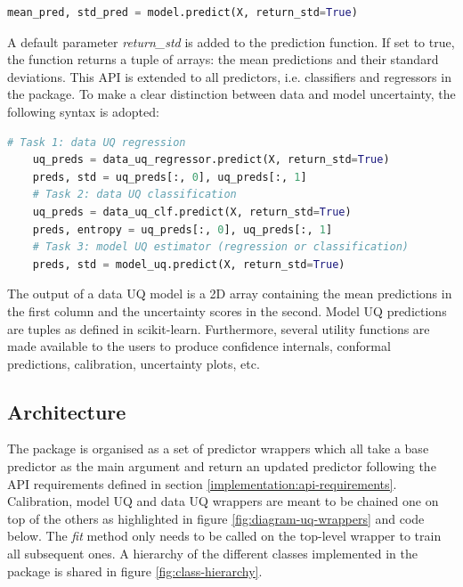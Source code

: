 \begin{lstlisting}[language=Python, caption=UQ sklearn API.]
    mean_pred, std_pred = model.predict(X, return_std=True)
\end{lstlisting}

A default parameter \textit{return\_std} is added to the prediction function. If set to true, the function returns a tuple of arrays: the mean predictions and their standard deviations. This API is extended to all predictors, i.e. classifiers and regressors in the package. To make a clear distinction between data and model uncertainty, the following syntax is adopted: 

\begin{lstlisting}[language=Python, caption=Extraction of uncertainty scores from predictions.]
    # Task 1: data UQ regression
    uq_preds = data_uq_regressor.predict(X, return_std=True)
    preds, std = uq_preds[:, 0], uq_preds[:, 1]
    # Task 2: data UQ classification
    uq_preds = data_uq_clf.predict(X, return_std=True)
    preds, entropy = uq_preds[:, 0], uq_preds[:, 1]
    # Task 3: model UQ estimator (regression or classification)
    preds, std = model_uq.predict(X, return_std=True)
\end{lstlisting}

The output of a data UQ model is a 2D array containing the mean predictions in the first column and the uncertainty scores in the second. Model UQ predictions are tuples as defined in scikit-learn. Furthermore, several utility functions are made available to the users to produce confidence internals, conformal predictions, calibration, uncertainty plots, etc.

\subsection{Architecture}

The package is organised as a set of predictor wrappers which all take a base predictor as the main argument and return an updated predictor following the API requirements defined in section \ref{implementation:api-requirements}. %
Calibration, model UQ and data UQ wrappers are meant to be chained one on top of the others as highlighted in figure \ref{fig:diagram-uq-wrappers} and code below. The \textit{fit} method only needs to be called on the top-level wrapper to train all subsequent ones. 
A hierarchy of the different classes implemented in the package is shared in figure \ref{fig:class-hierarchy}. 

